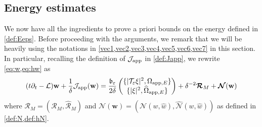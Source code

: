 \documentclass[11pt,reqno,a4paper]{amsart}
\def\eps{\varepsilon}
\def\de{{\partial}}
\newcommand{\cJ}{\mathcal{J}}
\newcommand{\cL}{\mathcal{L}}
\newcommand{\cN}{\mathcal{N}}
\newcommand{\cR}{\mathcal{R}}
\newcommand{\cT}{\mathcal{T}}
\newcommand{\app}{\mathrm{app}}
\newcommand{\1}{\mathbbm{1}}
\theoremstyle{definition}
\theoremstyle{definition}
\numberwithin{equation}{section}
\begin{document}
\subsection{Energy estimates}
We now have all the ingredients to prove a priori bounds on the energy defined in \cref{def:Eeps}. Before proceeding with the arguments, we remark that we will be heavily using the notations in \cref{vec1,vec2,vec3,vec4,vec5,vec6,vec7} in this section. In particular, recalling the definition of $\cJ_{\rm app}$ in \cref{def:Japp}, we rewrite \cref{eq:w,eq:hw} as 
\begin{align}
\label{eq:vecw}
    (t\de_t-\cL){\mathbf w}+\frac{1}{\delta}\cJ_{\rm app}({\mathbf w})=\frac{\mathfrak{b}_\eps}{2\delta}\begin{pmatrix}
                \{|\cT_\eps \xi|^2,\Omega_{\app,E}\}\\
                \{|\xi|^2,\widehat{\Omega}_{\app,E}\}
            \end{pmatrix}+\delta^{-2}\boldsymbol{\cR}_M+\boldsymbol{\cN}({\mathbf w})
\end{align}
        where $\boldsymbol{\cR}_M=(\cR_M,\widehat{\cR}_M)$         and $\boldsymbol{\cN}({\mathbf w})=(\cN(w,\widehat{w}),\widehat{\cN}(w,\widehat{w}))$ as defined in \cref{def:N,def:hN}.
\end{document}

